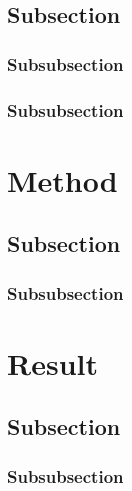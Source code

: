 \documentclass[../note.tex]{subfiles}
\begin{document}
\subsection{Subsection}
\lipsum[2]
\subsubsection{Subsubsection}
\lipsum[3]
\subsubsection{Subsubsection}
\lipsum[3]

\section{Method}
\lipsum[4]
\subsection{Subsection}
\lipsum[5]
\subsubsection{Subsubsection}
\lipsum[6]

\section{Result}
\lipsum[7]
\subsection{Subsection}
\lipsum[8]
\subsubsection{Subsubsection}
\lipsum[9]
\end{document}
